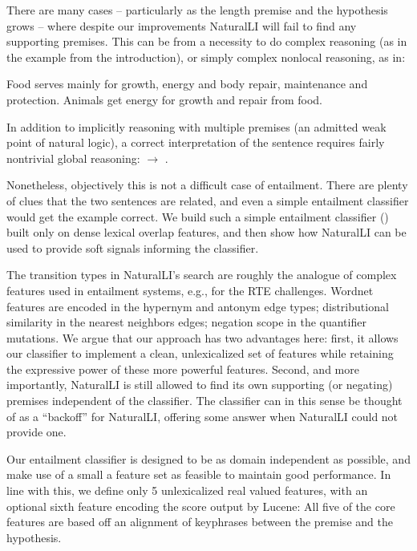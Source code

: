 There are many cases -- particularly as the length premise and the hypothesis grows --
  where despite our improvements NaturalLI will fail to find any supporting
  premises.
This can be from a necessity to do complex reasoning (as in the example from the 
  introduction), or simply complex nonlocal reasoning, as in:

\entailmentExample
{Food serves mainly for growth, energy and body repair, maintenance and protection.}
{Animals get energy for growth and repair from food.}

In addition to implicitly reasoning with multiple premises (an admitted weak
  point of natural logic), a correct interpretation of the sentence requires
  fairly nontrivial global reasoning: 
  $\rightarrow$ .

Nonetheless, objectively this is not a difficult case of entailment.
There are plenty of clues that the two sentences are related, and even a simple
  entailment classifier would get the example correct.
We build such a simple entailment classifier () built only
  on dense lexical overlap features, and
  then show how NaturalLI can be used to provide soft signals informing the classifier.

The transition types in NaturalLI's search are roughly the analogue of complex features
  used in entailment systems, e.g., for the RTE challenges.
Wordnet features are encoded in the hypernym and antonym edge types; distributional
  similarity in the nearest neighbors edges; negation scope in the quantifier
  mutations.
We argue that our approach has two advantages here: 
  first, it allows our classifier to implement a clean, unlexicalized set of
  features while retaining the expressive power of these more powerful features.
Second, and more importantly, NaturalLI is still allowed to find its own supporting
  (or negating) premises independent of the classifier.
The classifier can in this sense be thought of as a ``backoff'' for NaturalLI,
  offering some answer when NaturalLI could not provide one.


%
%
Our entailment classifier is designed to be as domain independent as possible,
  and make use of a small a feature set as feasible to maintain good performance.
In line with this, we define only 5 unlexicalized real valued features, with an 
  optional sixth feature encoding the score output by Lucene:
All five of the core features are based off an alignment of keyphrases between the
  premise and the hypothesis.

